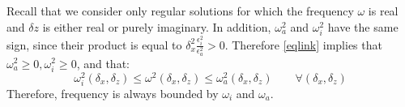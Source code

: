 \documentclass[a4paper,11pt]{article}
\begin{document}

Recall that we consider only regular solutions for which the frequency $\omega$ is real and $\delta z$ is either real or purely imaginary. In addition, $\omega_a^2$ and $\omega_i^2$ have the same sign, since their product is equal to $\delta_x^2\frac{\epsilon_i^2}{\epsilon_a^2} > 0$. Therefore \ref{eqlink} implies that $\omega_a^2\ge 0, \omega_i^2 \ge 0$, and that:
\[
\omega_i^2(\delta_x, \delta_z)\le \omega^2(\delta_x, \delta_z) \le \omega_a^2(\delta_x, \delta_z) \qquad\forall (\delta_x, \delta_z)
\]
Therefore, frequency is always bounded by $\omega_i$ and $\omega_a$.\\
\end{document}
